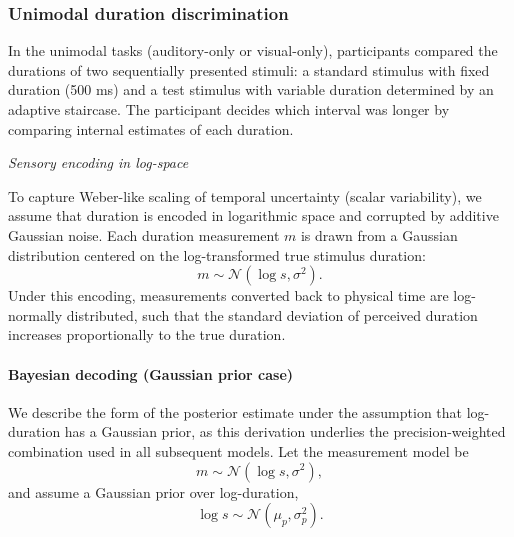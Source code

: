 \documentclass{jov}
\begin{document}
\subsubsection{Unimodal duration discrimination}

In the unimodal tasks (auditory-only or visual-only), participants compared the durations of two sequentially presented stimuli: a standard stimulus with fixed duration (500 ms) and a test stimulus with variable duration determined by an adaptive staircase. The participant decides which interval was longer by comparing internal estimates of each duration.


\textit{Sensory encoding in log-space}

To capture Weber-like scaling of temporal uncertainty (scalar variability), we assume that duration is encoded in logarithmic space and corrupted by additive Gaussian noise. Each duration measurement $m$ is drawn from a Gaussian distribution centered on the log-transformed true stimulus duration:
\begin{equation}
m \sim \mathcal{N}(\log s, \sigma^2).
\end{equation}
Under this encoding, measurements converted back to physical time are log-normally distributed, such that the standard deviation of perceived duration increases proportionally to the true duration.


\paragraph{Bayesian decoding (Gaussian prior case)}

We describe the form of the posterior estimate under the assumption that log-duration has a Gaussian prior, as this derivation underlies the precision-weighted combination used in all subsequent models. 
Let the measurement model be
\begin{equation}
m \sim \mathcal{N}(\log s, \sigma^2),
\label{eq:likelihood}
\end{equation}
and assume a Gaussian prior over log-duration,
\begin{equation}
\log s \sim \mathcal{N}(\mu_p, \sigma_p^2).
\label{eq:prior}
\end{equation}
\end{document}
